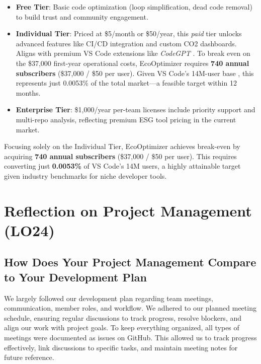 \documentclass{article}
\begin{document}
\begin{itemize}  
    \item \textbf{Free Tier}: Basic code optimization (loop simplification, dead code removal)
     to build trust and community engagement.   

    \item \textbf{Individual Tier}: Priced at \$5/month or \$50/year, this \textit{paid} 
    tier unlocks advanced features like CI/CD integration and custom CO2 dashboards. 
    Aligns with premium VS Code extensions like \textit{CodeGPT} \cite{codeGPTPricing}.
    To break even on the \$37,000 first-year operational costs, EcoOptimizer requires 
    \textbf{740 annual subscribers} (\$37,000 / \$50 per user). Given VS Code’s 14M-user 
    base \cite{vscodeUsers}, this represents just 0.0053\% of the total market—a 
    feasible target within 12 months.

    \item \textbf{Enterprise Tier}: \$1,000/year per-team licenses include priority 
    support and multi-repo analysis, reflecting premium ESG tool pricing in the current market.

\end{itemize}  

\noindent Focusing solely on the Individual Tier, EcoOptimizer achieves break-even by 
acquiring \textbf{740 annual subscribers} (\$37,000 / \$50 per user). This requires 
converting just \textbf{0.0053\%} of VS Code’s 14M users, a highly attainable target 
given industry benchmarks for niche developer tools.  

\section{Reflection on Project Management (LO24)}


\subsection{How Does Your Project Management Compare to Your Development Plan}


We largely followed our development plan regarding team meetings, communication, 
member roles, and workflow. We adhered to our planned meeting schedule, ensuring regular 
discussions to track progress, resolve blockers, and align our work with project goals. 
To keep everything organized, all types of meetings were documented as issues on GitHub. 
This allowed us to track progress effectively, link discussions to specific tasks, and 
maintain meeting notes for future reference.
\end{document}
